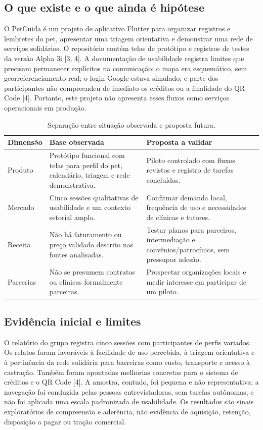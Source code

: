 \documentclass[12pt,a4paper]{article}
\begin{document}
\subsection{O que existe e o que ainda é hipótese}

O PetCuida é um projeto de aplicativo Flutter para organizar registros e lembretes do pet, apresentar uma triagem orientativa e demonstrar uma rede de serviços solidários. O repositório contém telas de protótipo e registros de testes da versão Alpha 3i [3, 4]. A documentação de usabilidade registra limites que precisam permanecer explícitos na comunicação: o mapa era esquemático, sem georreferenciamento real; o login Google estava simulado; e parte dos participantes não compreendeu de imediato os créditos ou a finalidade do QR Code [4]. Portanto, este projeto não apresenta esses fluxos como serviços operacionais em produção.

\begin{table}[H]
\centering
\small
\caption{Separação entre situação observada e proposta futura.}
\begin{tabularx}{\textwidth}{P{3.1cm}YY}
\toprule
\textbf{Dimensão} & \textbf{Base observada} & \textbf{Proposta a validar} \\
\midrule
Produto & Protótipo funcional com telas para perfil do pet, calendário, triagem e rede demonstrativa. & Piloto controlado com fluxos revistos e registro de tarefas concluídas. \\
Mercado & Cinco sessões qualitativas de usabilidade e um contexto setorial amplo. & Confirmar demanda local, frequência de uso e necessidades de clínicas e tutores. \\
Receita & Não há faturamento ou preço validado descrito nas fontes analisadas. & Testar planos para parceiros, intermediação e convênios/patrocínios, sem pressupor adesão. \\
Parcerias & Não se presumem contratos ou clínicas formalmente parceiras. & Prospectar organizações locais e medir interesse em participar de um piloto. \\
\bottomrule
\end{tabularx}
\end{table}

\subsection{Evidência inicial e limites}

O relatório do grupo registra cinco sessões com participantes de perfis variados. Os relatos foram favoráveis à facilidade de uso percebida, à triagem orientativa e à pertinência da rede solidária para barreiras como custo, transporte e acesso à castração. Também foram apontadas melhorias concretas para o sistema de créditos e o QR Code [4]. A amostra, contudo, foi pequena e não representativa; a navegação foi conduzida pelas pessoas entrevistadoras, sem tarefas autônomas, e não foi aplicada uma escala padronizada de usabilidade. Os resultados são sinais exploratórios de compreensão e aderência, não evidência de aquisição, retenção, disposição a pagar ou tração comercial.
\end{document}
